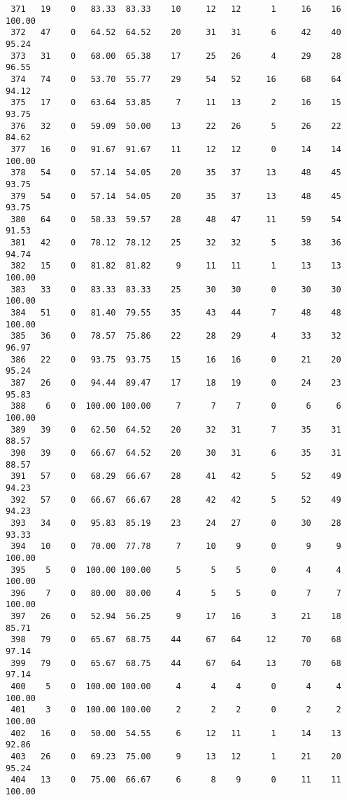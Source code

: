 \begin{verbatim}
 371   19    0   83.33  83.33    10     12   12      1     16    16   100.00
 372   47    0   64.52  64.52    20     31   31      6     42    40    95.24
 373   31    0   68.00  65.38    17     25   26      4     29    28    96.55
 374   74    0   53.70  55.77    29     54   52     16     68    64    94.12
 375   17    0   63.64  53.85     7     11   13      2     16    15    93.75
 376   32    0   59.09  50.00    13     22   26      5     26    22    84.62
 377   16    0   91.67  91.67    11     12   12      0     14    14   100.00
 378   54    0   57.14  54.05    20     35   37     13     48    45    93.75
 379   54    0   57.14  54.05    20     35   37     13     48    45    93.75
 380   64    0   58.33  59.57    28     48   47     11     59    54    91.53
 381   42    0   78.12  78.12    25     32   32      5     38    36    94.74
 382   15    0   81.82  81.82     9     11   11      1     13    13   100.00
 383   33    0   83.33  83.33    25     30   30      0     30    30   100.00
 384   51    0   81.40  79.55    35     43   44      7     48    48   100.00
 385   36    0   78.57  75.86    22     28   29      4     33    32    96.97
 386   22    0   93.75  93.75    15     16   16      0     21    20    95.24
 387   26    0   94.44  89.47    17     18   19      0     24    23    95.83
 388    6    0  100.00 100.00     7      7    7      0      6     6   100.00
 389   39    0   62.50  64.52    20     32   31      7     35    31    88.57
 390   39    0   66.67  64.52    20     30   31      6     35    31    88.57
 391   57    0   68.29  66.67    28     41   42      5     52    49    94.23
 392   57    0   66.67  66.67    28     42   42      5     52    49    94.23
 393   34    0   95.83  85.19    23     24   27      0     30    28    93.33
 394   10    0   70.00  77.78     7     10    9      0      9     9   100.00
 395    5    0  100.00 100.00     5      5    5      0      4     4   100.00
 396    7    0   80.00  80.00     4      5    5      0      7     7   100.00
 397   26    0   52.94  56.25     9     17   16      3     21    18    85.71
 398   79    0   65.67  68.75    44     67   64     12     70    68    97.14
 399   79    0   65.67  68.75    44     67   64     13     70    68    97.14
 400    5    0  100.00 100.00     4      4    4      0      4     4   100.00
 401    3    0  100.00 100.00     2      2    2      0      2     2   100.00
 402   16    0   50.00  54.55     6     12   11      1     14    13    92.86
 403   26    0   69.23  75.00     9     13   12      1     21    20    95.24
 404   13    0   75.00  66.67     6      8    9      0     11    11   100.00

\end{verbatim}
